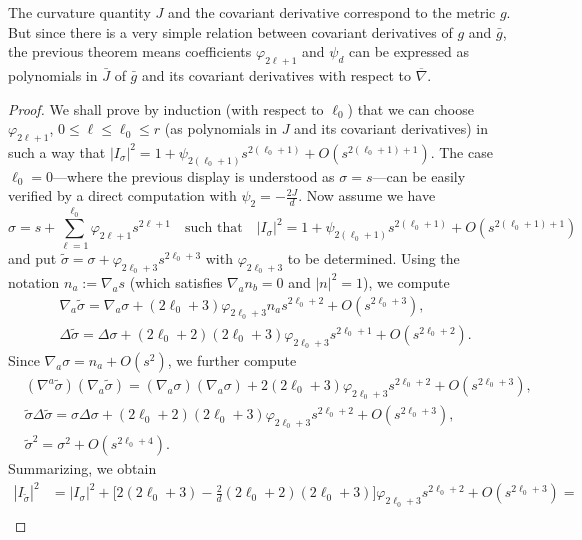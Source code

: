 \documentclass[a4paper,10.9pt]{amsart}
\theoremstyle{definition}
\theoremstyle{remark}
\numberwithin{equation}{section}
\renewcommand{\=}{\stackrel \Sigma =}
\renewcommand\leq{\leqslant}
\begin{document}
The curvature quantity $J$ and the covariant derivative correspond to the metric $g$. But since
there is a very simple relation between covariant derivatives of $g$ and $\bar{g}$, the previous theorem
means coefficients $\varphi_{2\ell+1}$ and $\psi_d$ can be expressed 
as polynomials in $\bar{J}$ of $\bar{g}$ and its covariant derivatives with respect to  $\overline{\nabla}$.

\begin{proof}
We shall prove by induction (with respect to $\ell_0$) that we can choose
$\varphi_{2\ell+1}$, $0 \leq \ell \leq \ell_0 \leq r$ 
(as polynomials in $J$ and its covariant derivatives) in such a way that 
$|I_\sigma|^2 = 1 + \psi_{2(\ell_0+1)} s^{2(\ell_0+1)} + O(s^{2(\ell_0+1)+1})$. 
The case $\ell_0=0$---where the previous display is understood as
$\sigma=s$---can be easily  verified by a direct computation with $\psi_2 = -\tfrac{2J}{d}$.
Now assume we have 
$$
\sigma = s + \sum_{\ell=1}^{\ell_0} \varphi_{2\ell+1} s^{2\ell+1}
\quad \text{such that} \quad
|I_\sigma|^2 = 1 + \psi_{2(\ell_0+1)} s^{2(\ell_0+1)} + O(s^{2(\ell_0+1)+1})
$$
and put $\tilde{\sigma} = \sigma + \varphi_{2\ell_0+3} s^{2\ell_0+3}$ with $\varphi_{2\ell_0+3}$
to be determined. Using the notation $n_a := \nabla_a s$ (which satisfies $\nabla_a n_b =0$ and $|n|^2=1$), 
we compute
\begin{align*}
& \nabla_a \tilde{\sigma} = \nabla_a \sigma + (2\ell_0+3) \varphi_{2\ell_0+3} n_a s^{2\ell_0+2}
+ O(s^{2\ell_0+3}), \\
& \Delta \tilde{\sigma} = \Delta \sigma + (2\ell_0+2) (2\ell_0+3) \varphi_{2\ell_0+3} s^{2\ell_0+1}
+ O(s^{2\ell_0+2}).
\end{align*}
Since $\nabla_a \sigma = n_a + O(s^2)$, we further compute
\begin{align*}
& (\nabla^a \tilde{\sigma})(\nabla_a \tilde{\sigma}) = (\nabla_a \sigma)( \nabla_a \sigma) + 2(2\ell_0+3) \varphi_{2\ell_0+3} s^{2\ell_0+2} + O(s^{2\ell_0+3}), \\
& \tilde{\sigma} \Delta \tilde{\sigma} = \sigma \Delta \sigma + (2\ell_0+2) (2\ell_0+3) \varphi_{2\ell_0+3} s^{2\ell_0+2} + O(s^{2\ell_0+3}), \\
& \tilde{\sigma}^2 = \sigma^2 + O(s^{2\ell_0+4}).
\end{align*}
Summarizing, we obtain
\begin{equation} \label{Isigma}
\begin{split}
|I_{\tilde{\sigma}}|^2 &= |I_{\sigma}|^2 + \bigl[ 2(2\ell_0+3) - \tfrac{2}{d} (2\ell_0+2) (2\ell_0+3) \bigr]
 \varphi_{2\ell_0+3} s^{2\ell_0+2} + O(s^{2\ell_0+3}) = \\

\end{split}
\end{equation}
\end{proof}
\end{document}
